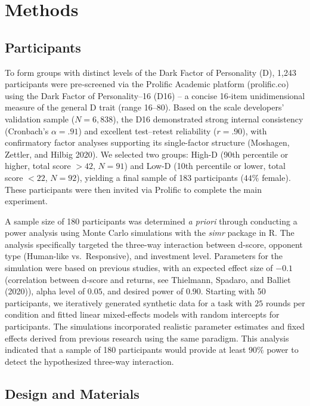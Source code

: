 \documentclass[
]{article}
\begin{document}
\section{Methods}\label{methods}

\subsection{Participants}\label{participants}

To form groups with distinct levels of the Dark Factor of Personality (D), 1,243 participants were pre‑screened via the Prolific Academic platform (prolific.co) using the Dark Factor of Personality--16 (D16) -- a concise 16‑item unidimensional measure of the general D trait (range 16--80).
Based on the scale developers' validation sample (\(N = 6{,}838\)), the D16 demonstrated strong internal consistency (Cronbach's \(\alpha = .91\)) and excellent test--retest reliability (\(r = .90\)), with confirmatory factor analyses supporting its single-factor structure (Moshagen, Zettler, and Hilbig 2020).
We selected two groups: High-D (90th percentile or higher, total score \(> 42\), \(N = 91\)) and Low-D (10th percentile or lower, total score \(< 22\), \(N = 92\)), yielding a final sample of 183 participants (\(44\%\) female). These participants were then invited via Prolific to complete the main experiment.

A sample size of 180 participants was determined \emph{a priori} through conducting a power analysis using Monte Carlo simulations with the \emph{simr} package in R. The analysis specifically targeted the three-way interaction between d-score, opponent type (Human-like vs.~Responsive), and investment level. Parameters for the simulation were based on previous studies, with an expected effect size of \(-0.1\) (correlation between d-score and returns, see Thielmann, Spadaro, and Balliet (2020)), alpha level of \(0.05\), and desired power of \(0.90\). Starting with 50 participants, we iteratively generated synthetic data for a task with \(25\) rounds per condition and fitted linear mixed-effects models with random intercepts for participants. The simulations incorporated realistic parameter estimates and fixed effects derived from previous research using the same paradigm. This analysis indicated that a sample of 180 participants would provide at least \(90\%\) power to detect the hypothesized three-way interaction.

\subsection{Design and Materials}\label{design-and-materials}
\end{document}
